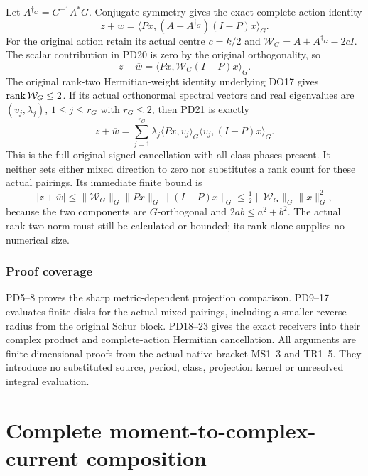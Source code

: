 \documentclass[11pt]{article}
\begin{document}
Let $A^{\dagger_G}=G^{-1}A^*G$.  Conjugate symmetry gives the exact
complete-action identity
\[
 \boxed{z+\overline w
       =\langle Px,(A+A^{\dagger_G})(I-P)x\rangle_G.}            \tag{PD20}
\]
For the original action retain its actual centre $c=k/2$ and
$\mathcal W_G=A+A^{\dagger_G}-2cI$.  The scalar contribution in
PD20 is zero by the original orthogonality, so
\[
 z+\overline w=\langle Px,\mathcal W_G(I-P)x\rangle_G.           \tag{PD21}
\]
The original rank-two Hermitian-weight identity underlying DO17
gives $\operatorname{rank}\mathcal W_G\le2$.  If its actual orthonormal spectral
vectors and real eigenvalues are $(v_j,\lambda_j)$, $1\le j\le r_G$
with $r_G\le2$, then PD21 is exactly
\[
 z+\overline w
   =\sum_{j=1}^{r_G}\lambda_j
       \langle Px,v_j\rangle_G\langle v_j,(I-P)x\rangle_G.        \tag{PD22}
\]
This is the full original signed cancellation with all class phases
present.  It neither sets either mixed direction to zero nor
substitutes a rank count for these actual pairings.  Its immediate
finite bound is
\[
 |z+\overline w|
 \le\|\mathcal W_G\|_G\|Px\|_G\|(I-P)x\|_G
 \le\tfrac12\|\mathcal W_G\|_G\|x\|_G^2,                      \tag{PD23}
\]
because the two components are $G$-orthogonal and
$2ab\le a^2+b^2$.  The actual rank-two norm must still be
calculated or bounded; its rank alone supplies no numerical size.

\section{Proof coverage}
PD5--8 proves the sharp metric-dependent projection comparison.
PD9--17 evaluates finite disks for the actual mixed pairings,
including a smaller reverse radius from the original Schur block.
PD18--23 gives the exact receivers into their complex product and
complete-action Hermitian cancellation.  All arguments are
finite-dimensional proofs from the actual native bracket MS1--3
and TR1--5.  They introduce no substituted source, period, class,
projection kernel or unresolved integral evaluation.

\endgroup

\clearpage\begingroup
\part*{Complete moment-to-complex-current composition}
\newcommand{\mcompC}{\mathbb C}
\newcommand{\mcomptr}{\operatorname{tr}}
\end{document}
